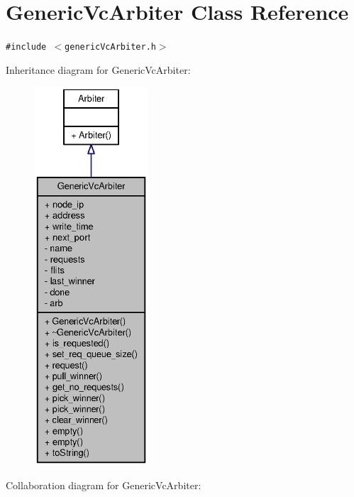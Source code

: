 \section{GenericVcArbiter Class Reference}
\label{classGenericVcArbiter}
{\tt \#include $<$genericVcArbiter.h$>$}

Inheritance diagram for GenericVcArbiter:\nopagebreak
\begin{figure}[H]
\begin{center}
\leavevmode
\includegraphics[height=400pt]{classGenericVcArbiter__inherit__graph}
\end{center}
\end{figure}
Collaboration diagram for GenericVcArbiter:\nopagebreak
